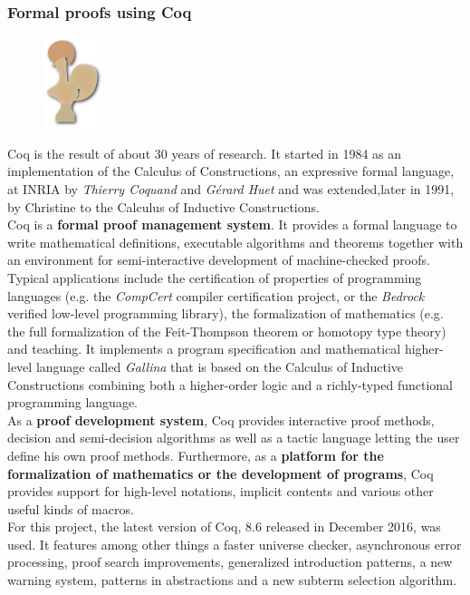 \subsubsection{Formal proofs using Coq} 
\begin{figure}
\vspace{-14pt}
\centering
\includegraphics[frame]{img/CoqLogo.png}
\end{figure}
Coq is the result of about 30 years of research.
It started in 1984 as an implementation of the Calculus of Constructions, an expressive formal language, at INRIA by \textit{Thierry Coquand} and \textit{Gérard Huet} and was extended,later in 1991, by Christine to the Calculus of Inductive Constructions. \\

Coq is a \textbf{formal proof management system}. It provides a formal language to write mathematical definitions, executable algorithms and theorems together with an environment for semi-interactive development of machine-checked proofs. Typical applications include the certification of properties of programming languages (e.g. the \textit{CompCert} compiler certification project, or the \textit{Bedrock} verified low-level programming library), the formalization of mathematics (e.g. the full formalization of the Feit-Thompson theorem or homotopy type theory) and teaching. It implements a program specification and mathematical higher-level language called \textit{Gallina} that is based on the Calculus of Inductive Constructions combining both a higher-order logic and a richly-typed functional programming language.\\

As a \textbf{proof development system}, Coq provides interactive proof methods, decision and semi-decision algorithms as well as a tactic language letting the user define his own proof methods. Furthermore, as a \textbf{platform for the formalization of mathematics or the development of programs}, Coq provides support for high-level notations, implicit contents and various other useful kinds of macros.\\

For this project, the latest version of Coq, 8.6 released in December 2016, was used. It features among other things a faster universe checker, asynchronous error processing, proof search improvements, generalized introduction patterns, a new warning system, patterns in abstractions and a new subterm selection algorithm. \\

